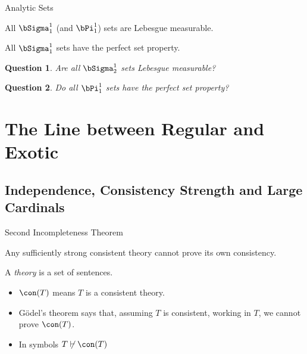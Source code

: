\documentclass{beamer}
\newtheorem*{question}{Question}
\begin{document}
\begin{frame}{Analytic Sets}

\begin{theorem}[Luzin, 1917]
All $\bSigma^1_1$ (and $\bPi^1_1$) sets are Lebesgue measurable.
\end{theorem}

\begin{theorem}[Suslin, 1917]
All $\bSigma^1_1$  sets have the perfect set property.
\end{theorem}

\begin{question}
Are all $\bSigma^1_2$ sets Lebesgue measurable?
\end{question}

\begin{question}
Do all $\bPi^1_1$ sets have the perfect set property?
\end{question}

\end{frame}

\section{The Line between Regular and Exotic}

\subsection{Independence, Consistency Strength and Large Cardinals}

\begin{frame}{Second Incompleteness Theorem}
\begin{theorem}
Any sufficiently strong consistent theory cannot prove its own consistency.
\end{theorem}

\begin{definition}
A \emph{theory} is a set of sentences.
\end{definition}

\begin{itemize}
\item $\con(T)$ means $T$ is a consistent theory.
\item G\"{o}del's theorem says that, assuming $T$ is consistent,  working in
$T$, we cannot prove $\con(T)$.
\item In symbols $T\not\vdash\con(T)$
\end{itemize}

\end{frame}
\end{document}
